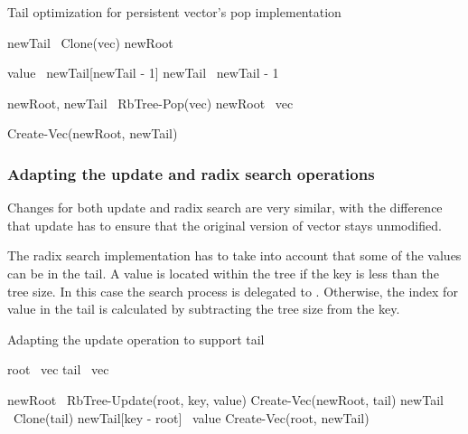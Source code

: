 \begin{listing}[ht!]
    \caption{Tail optimization for persistent vector’s pop implementation}
    \label{lst:pvec-pop}

    \begin{algorithmic}

        \State newTail \la\ Clone(vec)
        \State newRoot \la\ \nil{}

        \State value \la\ newTail[newTail - 1]
        \State newTail \la\ newTail - 1

            \State newRoot, newTail \la\ RbTree-Pop(vec)
        \Else
            \State newRoot \la\ vec
        \EndIf

        \State \Return Create-Vec(newRoot, newTail)
        \EndFunction
    \end{algorithmic}
\end{listing}

\subsubsection*{Adapting the update and radix search operations}
Changes for both update and radix search are very similar, with the difference that update has to ensure that the original version of vector stays unmodified.

The radix search implementation has to take into account that some of the values can be in the tail. A value is located within the tree if the key is less than the tree size. In this case the search process is delegated to \rbtree. Otherwise, the index for value in the tail is calculated by subtracting the tree size from the key.

\begin{listing}[ht!]
    \caption{Adapting the update operation to support tail}
    \label{lst:pvec-update}

    \begin{algorithmic}

        \State root \la\ vec
        \State tail \la\ vec

            \State newRoot \la\ RbTree-Update(root, key, value)
            \State \Return Create-Vec(newRoot, tail)
        \Else
            \State newTail \la\ Clone(tail)
            \State newTail[key - root] \la\ value
            \State \Return Create-Vec(root, newTail)
        \EndIf
        \EndFunction
    \end{algorithmic}
\end{listing}

